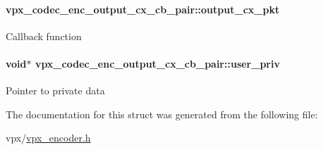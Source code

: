 \paragraph[{\texorpdfstring{output\+\_\+cx\+\_\+pkt}{output_cx_pkt}}]{ vpx\+\_\+codec\+\_\+enc\+\_\+output\+\_\+cx\+\_\+cb\+\_\+pair\+::output\+\_\+cx\+\_\+pkt}\hypertarget{structvpx__codec__enc__output__cx__cb__pair_acd1d60f7b6f9f483c2092c69afe824a5}{}\label{structvpx__codec__enc__output__cx__cb__pair_acd1d60f7b6f9f483c2092c69afe824a5}
Callback function 
\paragraph[{\texorpdfstring{user\+\_\+priv}{user_priv}}]{\setlength{\rightskip}{0pt plus 5cm}void$\ast$ vpx\+\_\+codec\+\_\+enc\+\_\+output\+\_\+cx\+\_\+cb\+\_\+pair\+::user\+\_\+priv}\hypertarget{structvpx__codec__enc__output__cx__cb__pair_abdb90f4a657b70be286327b091c8f70c}{}\label{structvpx__codec__enc__output__cx__cb__pair_abdb90f4a657b70be286327b091c8f70c}
Pointer to private data 

The documentation for this struct was generated from the following file\+:\begin{DoxyCompactItemize}
\item 
vpx/\hyperlink{vpx__encoder_8h}{vpx\+\_\+encoder.\+h}\end{DoxyCompactItemize}
